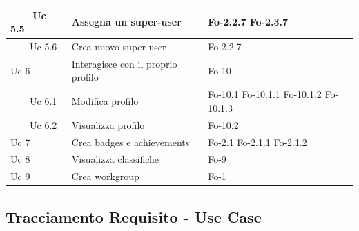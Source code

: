 \documentclass[10pt,a4paper]{article}
\begin{document}
\begin{longtable}{|p{3.5cm}|p{6.5cm}|p{3cm}|}
\hline
\ \ \ \ Uc 5.5 & Assegna un super-user & Fo-2.2.7 \newline Fo-2.3.7\\
\hline
\ \ \ \ Uc 5.6 & Crea nuovo super-user & Fo-2.2.7 \\
\hline
Uc 6 & Interagisce con il proprio profilo & Fo-10\\
\hline
\ \ \ \ Uc 6.1 & Modifica profilo & Fo-10.1 \newline Fo-10.1.1 \newline Fo-10.1.2 \newline Fo-10.1.3\\
\hline
\ \ \ \ Uc 6.2 & Visualizza profilo & Fo-10.2\\
\hline
Uc 7 & Crea badges e achievements & Fo-2.1 \newline Fo-2.1.1 \newline Fo-2.1.2\\
\hline
Uc 8 & Visualizza classifiche & Fo-9\\
\hline
Uc 9 & Crea workgroup & Fo-1\\

\end{longtable}

\newpage

\subsection{Tracciamento Requisito - Use Case}
\end{document}
